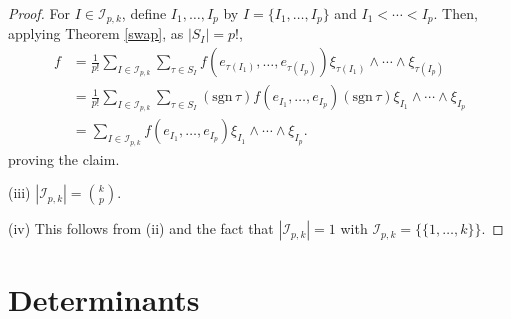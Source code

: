 \documentclass{amsart}
\newcommand{\sgn}{\mathrm{sgn}\,}
\theoremstyle{definition}
\begin{document}
\begin{proof}
For $I \in \mathscr{I}_{p,k}$, define $I_1,\ldots,I_p$ by $I=\{I_1,\ldots,I_p\}$ and
$I_1<\cdots<I_p$. 
Then, applying Theorem \ref{swap}, as $|S_I|=p!$,
\begin{align*}
f&= \frac{1}{p!} \sum_{I \in \mathscr{I}_{p,k}} \sum_{\tau \in S_I} f(e_{\tau(I_1)},\ldots,e_{\tau(I_p)}) \xi_{\tau(I_1)} \wedge \cdots \wedge \xi_{\tau(I_p)}\\
&=\frac{1}{p!} \sum_{I \in \mathscr{I}_{p,k}} \sum_{\tau \in S_I} (\sgn \tau) f(e_{I_1},\ldots,e_{I_p}) (\sgn \tau) \xi_{I_1} \wedge \cdots \wedge \xi_{I_p}\\
&=\sum_{I \in \mathscr{I}_{p,k}} f(e_{I_1},\ldots,e_{I_p}) \xi_{I_1} \wedge \cdots \wedge \xi_{I_p}.
\end{align*}
proving the claim.

(iii) $|\mathscr{I}_{p,k}| = \binom{k}{p}$.

(iv) This follows from (ii) and the fact that $|\mathscr{I}_{p,k}|=1$ with $\mathscr{I}_{p,k} = \{\{1,\ldots,k\}\}$.
\end{proof}






\section{Determinants}











\end{document}
